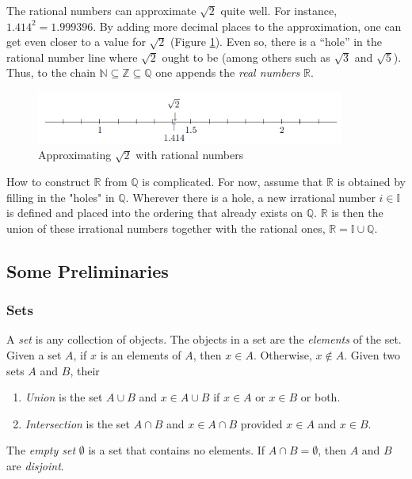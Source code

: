 \documentclass{article}
\begin{document}
    The rational numbers can approximate $\sqrt{2}$ quite well. For instance, $1.414^2 = 1.999396$. By adding more decimal places to the approximation, one can get even closer to a value for $\sqrt{2}$ (Figure \ref{approx. sqrt2}). Even so, there is a “hole” in the rational number line where $\sqrt{2}$ ought to be (among others such as $\sqrt{3}$ and $\sqrt{5}$). Thus, to the chain $\mathbb{N} \subseteq \mathbb{Z} \subseteq \mathbb{Q}$ one appends the \textit{real numbers} $\mathbb{R}$.\\
    \begin{figure}[ht!]
        \centering
        \includegraphics[width=0.9\textwidth]{figs/approx. sqrt2.png}
        \caption{Approximating $\sqrt{2}$ with rational numbers}
        \label{approx. sqrt2}
    \end{figure}
    How to construct $\mathbb{R}$ from $\mathbb{Q}$ is complicated. For now, assume that $\mathbb{R}$ is obtained by filling in the "holes" in $\mathbb{Q}$. Wherever there is a hole, a new irrational number $i \in \mathbb{I}$ is defined and placed into the ordering that already exists on $\mathbb{Q}$. $\mathbb{R}$ is then the union of these irrational numbers  together with the rational ones, $\mathbb{R} = \mathbb{I} \cup \mathbb{Q}$.

\subsection{Some Preliminaries}
\subsubsection{Sets}
    A \textit{set} is any collection of objects. The objects in a set are the \textit{elements} of the set. Given a set $A$, if $x$ is an elements of $A$, then $x \in A$. Otherwise, $x \notin A$. Given two sets $A$ and $B$, their
    \begin{enumerate}
        \item \textit{Union} is the set $A \cup B$ and $x \in A \cup B$ if $x \in A$ or $x \in B$ or both.
        \item \textit{Intersection} is the set $A \cap B$ and $x \in A \cap B$ provided $x \in A$ and $x \in B$. 
    \end{enumerate}
    The \textit{empty set} $\emptyset$ is a set that contains no elements. If $A \cap B = \emptyset$, then $A$ and $B$ are \textit{disjoint}.
    
\end{document}
